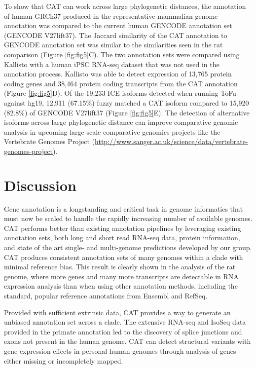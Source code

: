 \documentclass[fleqn,10pt]{wlscirep}
\begin{document}
To show that CAT can work across large phylogenetic distances, the annotation of human GRCh37 produced in the representative mammalian genome annotation was compared to the current human GENCODE annotation set (GENCODE V27lift37). The Jaccard similarity of the CAT annotation to GENCODE annotation set was similar to the similarities seen in the rat comparison (Figure \ref{fig:fig5}C). The two annotation sets were compared using Kallisto with a human iPSC RNA-seq dataset that was not used in the annotation process. Kallisto was able to detect expression of 13,765 protein coding genes and 38,464 protein coding transcripts from the CAT annotation (Figure \ref{fig:fig5}D). Of the 19,233 ICE isoforms detected when running ToFu \cite{gordon2015widespread} against hg19, 12,911 (67.15\%) fuzzy matched a CAT isoform compared to 15,920 (82.8\%) of GENCODE V27lift37 (Figure \ref{fig:fig5}E). The detection of alternative isoforms across large phylogenetic distance can improve comparative genomic analysis in upcoming large scale comparative genomics projects like the Vertebrate Genomes Project \cite{haussler2009genome} (\url{http://www.sanger.ac.uk/science/data/vertebrate-genomes-project}).

\section*{Discussion}
Gene annotation is a longstanding and critical task in genome informatics that must now be scaled to handle the rapidly increasing number of available genomes. CAT performs better than existing annotation pipelines by leveraging existing annotation sets, both long and short read RNA-seq data, protein information, and state of the art single- and multi-genome predictions developed by our group. CAT produces consistent annotation sets of many genomes within a clade with minimal reference bias. This result is clearly shown in the analysis of the rat genome, where more genes and many more transcripts are detectable in RNA expression analysis than when using other annotation methods, including the standard, popular reference annotations from Ensembl and RefSeq.

Provided with sufficient extrinsic data, CAT provides a way to generate an unbiased annotation set across a clade. The extensive RNA-seq and IsoSeq data provided in the primate annotation led to the discovery of splice junctions and exons not present in the human genome. CAT can detect structural variants with gene expression effects in personal human genomes through analysis of genes either missing or incompletely mapped.
\end{document}
